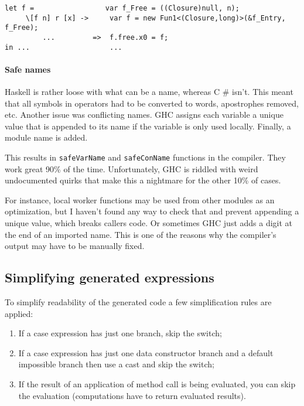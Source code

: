 \documentclass[en]{pracamgr}
\newcommand{\shrp}{%
  {\fontfamily{ppl}\selectfont\#%
  }}
\begin{document}
\begin{center}
\verb|let f =                 var f_Free = ((Closure)null, n);                   |\\
\verb|     \[f n] r [x] ->     var f = new Fun1<(Closure,long)>(&f_Entry, f_Free);|\\
\verb|         ...         =>  f.free.x0 = f;                                     |\\
\verb|in ...                   ...                                                |\\
\end{center}

\paragraph{Safe names}\label{c:safe_names}
Haskell is rather loose with what can be a name, whereas C\shrp{} isn't.
This meant that all symbols in operators had to be converted to words,
apostrophes removed, etc. Another issue was conflicting names.
GHC assigns each variable a unique value that is appended to its name
if the variable is only used locally. Finally, a module name is added.

This results in \texttt{safeVarName} and \texttt{safeConName} functions in the compiler.
They work great 90\% of the time. Unfortunately, GHC is riddled with weird undocumented
quirks that make this a nightmare for the other 10\% of cases.

For instance, local worker functions may be used from other modules as an optimization,
but I haven't found any way to check that and prevent appending a unique value,
which breaks callers code. Or sometimes GHC just adds a digit at the end of an imported name.
This is one of the reasons why the compiler's output may have to be manually fixed.

\newpage
\subsection{Simplifying generated expressions}
To simplify readability of the generated code a few simplification rules are applied:

\begin{enumerate}
    \item If a case expression has just one branch, skip the switch;
    \item If a case expression has just one data constructor branch and a default impossible branch
            then use a cast and skip the switch;
    \item If the result of an application of method call is being evaluated, you can skip the evaluation
        (computations have to return evaluated results).
\end{enumerate}
\end{document}
